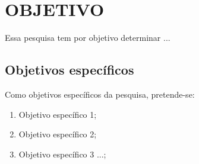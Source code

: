 \section{OBJETIVO}
\label{sec:objetivos}

Essa pesquisa tem por objetivo determinar ...

\subsection{Objetivos específicos}

Como objetivos específicos da pesquisa, pretende-se:
\begin{enumerate}[label=(\alph*)]
	\item Objetivo específico 1;
 	\item Objetivo específico 2;
	\item Objetivo específico 3 ...; 
\end{enumerate}
